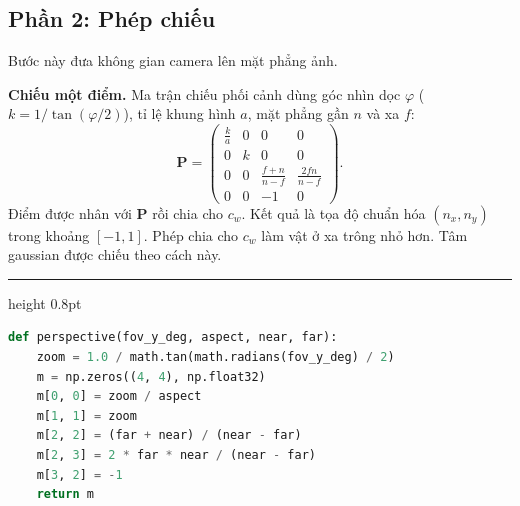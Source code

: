 \documentclass[9pt,twocolumn,a4paper]{extarticle}
\newenvironment{codebox}{\par\vspace{5pt}\noindent\begin{minipage}{\columnwidth}\hrule height 0.8pt\vspace{2pt}}{\end{minipage}\par\vspace{5pt}\noindent\ignorespaces}
\newcommand{\code}[1]{\texttt{#1}}
\begin{document}
\subsection{Phần 2: Phép chiếu}
\label{sec:ewa}
Bước này đưa không gian camera lên mặt phẳng ảnh.

\textbf{Chiếu một điểm.} Ma trận chiếu phối cảnh dùng góc nhìn dọc $\varphi$ ($k=1/\tan(\varphi/2)$), tỉ lệ khung hình $a$, mặt phẳng gần $n$ và xa $f$:
\begin{equation}
\mathbf{P}=\begin{pmatrix}
\frac{k}{a}&0&0&0\\0&k&0&0\\
0&0&\frac{f+n}{n-f}&\frac{2fn}{n-f}\\0&0&-1&0\end{pmatrix}.
\label{eq:proj}
\end{equation}
Điểm được nhân với $\mathbf{P}$ rồi chia cho $c_w$. Kết quả là tọa độ chuẩn hóa $(n_x,n_y)$ trong khoảng $[-1,1]$. Phép chia cho $c_w$ làm vật ở xa trông nhỏ hơn. Tâm gaussian được chiếu theo cách này.

\begin{codebox}
\begin{lstlisting}[language=Python,caption={\code{core/math3d.py}, \code{perspective}: ma trận chiếu $\mathbf{P}$},label={lst:persp}]
def perspective(fov_y_deg, aspect, near, far):
    zoom = 1.0 / math.tan(math.radians(fov_y_deg) / 2)
    m = np.zeros((4, 4), np.float32)
    m[0, 0] = zoom / aspect
    m[1, 1] = zoom
    m[2, 2] = (far + near) / (near - far)
    m[2, 3] = 2 * far * near / (near - far)
    m[3, 2] = -1
    return m
\end{lstlisting}
\end{codebox}
\end{document}
